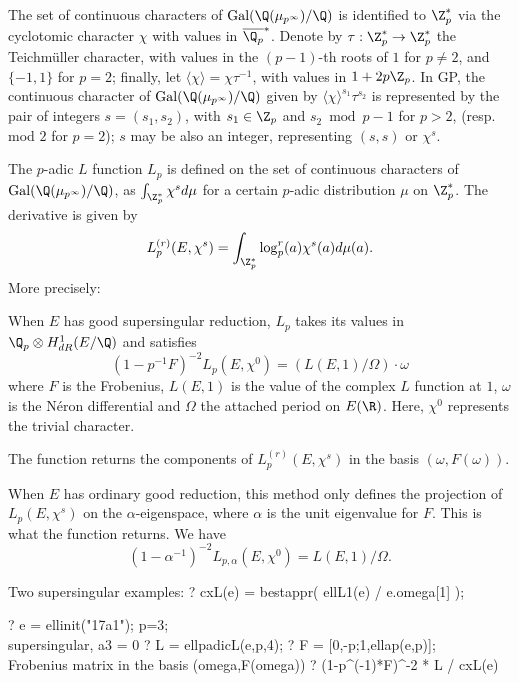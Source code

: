  The set of continuous characters of
$\text{Gal}(\Q(\mu_{p^{\infty}})/ \Q)$ is identified to $\Z_p^*$ via the
cyclotomic character $\chi$ with values in $\overline{\Q_p}^*$. Denote by
$\tau:\Z_p^*\to\Z_p^*$ the Teichm\"uller character, with values
in the $(p-1)$-th roots of $1$ for $p\neq 2$, and $\{-1,1\}$ for $p = 2$;
finally, let
$\langle\chi\rangle =\chi \tau^{-1}$, with values in $1 + 2p\Z_p$.
In GP, the continuous character of
$\text{Gal}(\Q(\mu_{p^{\infty}})/ \Q)$ given by $\langle\chi\rangle^{s_1}
\tau^{s_2}$ is represented by the pair of integers $s=(s_1,s_2)$, with $s_1
\in \Z_p$ and $s_2 \bmod p-1$ for $p > 2$, (resp. mod $2$ for $p = 2$); $s$
may be also an integer, representing $(s,s)$ or $\chi^s$.

The $p$-adic $L$ function $L_p$ is defined on the set of continuous
characters of $\text{Gal}(\Q(\mu_{p^{\infty}})/ \Q)$, as $\int_{\Z_p^*}
\chi^s d \mu$ for a certain $p$-adic distribution $\mu$ on $\Z_p^*$. The
derivative is given by
$$L_p^{(r)}(E, \chi^s) = \int_{\Z_p^*} \log_p^r(a) \chi^s(a) d\mu(a).$$
More precisely:

\item When $E$ has good supersingular reduction, $L_p$ takes its
values in $\Q_p \otimes H^1_{dR}(E/\Q)$ and satisfies
$$(1-p^{-1} F)^{-2} L_p(E, \chi^0)= (L(E,1) / \Omega) \cdot \omega$$
where $F$ is the Frobenius, $L(E,1)$ is the value of the complex $L$
function at $1$, $\omega$ is the N\'eron differential
and $\Omega$ the attached period on $E(\R)$. Here, $\chi^0$ represents
the trivial character.

The function returns the components of $L_p^{(r)}(E,\chi^s)$ in
the basis $(\omega, F(\omega))$.

\item When $E$ has ordinary good reduction, this method only defines
the projection of $L_p(E,\chi^s)$ on the $\alpha$-eigenspace,
where $\alpha$ is the unit eigenvalue for $F$. This is what the function
returns. We have
$$(1- \alpha^{-1})^{-2} L_{p,\alpha}(E,\chi^0)= L(E,1) / \Omega.$$

Two supersingular examples:
\bprog
? cxL(e) = bestappr( ellL1(e) / e.omega[1] );

? e = ellinit("17a1"); p=3; \\ supersingular, a3 = 0
? L = ellpadicL(e,p,4);
? F = [0,-p;1,ellap(e,p)]; \\ Frobenius matrix in the basis (omega,F(omega))
? (1-p^(-1)*F)^-2 * L / cxL(e)

